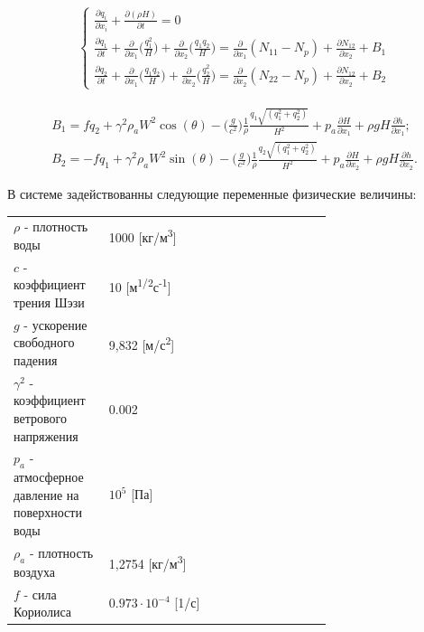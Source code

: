 \documentclass[14pt]{extreport}
\begin{document}
\begin{eqnarray}\label{eq:task:1}
\begin{cases}
\frac{ \partial q_i}{\partial x_i} + \frac{\partial(\rho H)}{\partial t} = 0 \nonumber\\
\frac{\partial q_1}{\partial t} + \frac{\partial}{\partial x_1} \bigg(\frac{q_1^2}{H}\bigg)+\frac{\partial }{\partial x_2}\bigg(\frac{q_1 q_2}{H}\bigg) = \frac{\partial}{\partial x_1} (N_{11}-N_p) + \frac{\partial N_{12}}{\partial x_2} + B_1 \nonumber\\
\frac{\partial q_2}{\partial t} + \frac{\partial}{\partial x_1} \bigg(\frac{q_1 q_2}{H}\bigg)+\frac{\partial }{\partial x_2}\bigg(\frac{q_2^2}{H}\bigg) = \frac{\partial}{\partial x_2} (N_{22}-N_p) + \frac{\partial N_{12}}{\partial x_2} + B_2
\end{cases}
\end{eqnarray}


\begin{eqnarray}\label{eq:task:2}
B_1=fq_2+\gamma^2\rho_aW^2\cos(\theta)-\bigg(\frac{g}{c^2}\bigg)\frac{1}{\rho}\frac{q_1\sqrt{(q_1^2+q_2^2)}}{H^2} + p_a \frac{\partial H}{\partial x_1} + \rho gH\frac{\partial h}{\partial x_1}; \\
B_2=-fq_1+\gamma^2\rho_aW^2\sin(\theta)-\bigg(\frac{g}{c^2}\bigg)\frac{1}{\rho}\frac{q_2\sqrt{(q_1^2+q_2^2)}}{H^2} + p_a \frac{\partial H}{\partial x_2} + \rho gH\frac{\partial h}{\partial x_2}.
\end{eqnarray}

В системе задействованны следующие переменные физические величины:

\begin{threeparttable}
\begin{longtable}[H]{lp{0.7\linewidth}}
{$\rho$} - плотность воды & 1000 [кг/м\textsuperscript3] \\
{$c$} - коэффициент трения Шэзи & 10 [м\textsuperscript{1/2}с\textsuperscript{-1}] \\
{$g$} - ускорение свободного падения & 9,832 [м/с\textsuperscript{2}] \\
{$\gamma^2$} - коэффициент ветрового напряжения & 0.002 \\

{$p_a$} - атмосферное давление на поверхности воды & $10^5$ [Па] \\
{$\rho_a$} - плотность воздуха & 1,2754 [кг/м\textsuperscript3] \\
{$f$} - сила Кориолиса & $0.973 \cdot 10^{-4}$ [1/с] \\
\end{longtable} 
\end{threeparttable}
\end{document}
